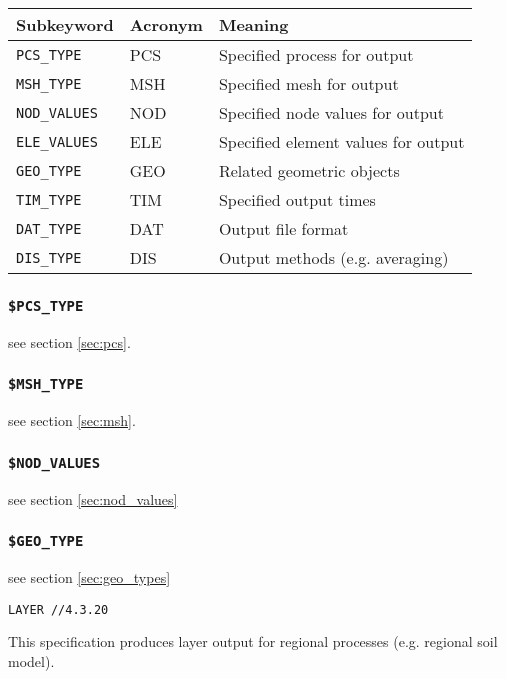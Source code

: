 \begin{tabular*}{12.773cm}{|p{}|p{1.5cm}|p{7cm}|} \hline
Subkeyword          & Acronym & Meaning \\ \hline \hline
%
\texttt{PCS\_TYPE}   & PCS &  Specified process for output \\
\texttt{MSH\_TYPE}   & MSH &  Specified mesh for output \\
\texttt{NOD\_VALUES} & NOD &  Specified node values for output \\
\texttt{ELE\_VALUES} & ELE &  Specified element values for output \\
\texttt{GEO\_TYPE}   & GEO &  Related geometric objects \\
\texttt{TIM\_TYPE}   & TIM &  Specified output times \\
\texttt{DAT\_TYPE}   & DAT &  Output file format \\
\texttt{DIS\_TYPE}   & DIS &  Output methods (e.g. averaging) \\
\hline
\end{tabular*}

\subsubsection{\texttt{\$PCS\_TYPE}}

see section \ref{sec:pcs}.

\subsubsection{\texttt{\$MSH\_TYPE}}

see section \ref{sec:msh}.

\subsubsection{\texttt{\$NOD\_VALUES}}

see section \ref{sec:nod_values}

\subsubsection{\texttt{\$GEO\_TYPE}}

see section \ref{sec:geo_types}

\small
\begin{verbatim}
LAYER //4.3.20
\end{verbatim}
\normalsize \vspace{-2mm}
%
This specification produces layer output for regional processes
(e.g. regional soil model).

